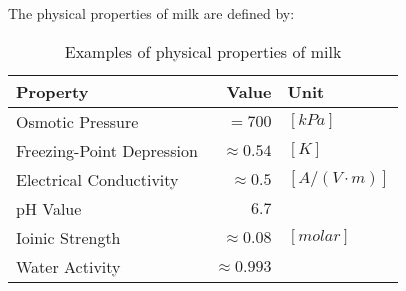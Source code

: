 The physical properties of milk are defined by:
\begin{table}[h]
    \centering
    \caption{Examples of physical properties of milk}
    \label{tab:milk_physical_properties}
    \begin{tabular}{ l  r l }
        \textbf{Property} & \textbf{Value} & \textbf{Unit}\\ 
        \hline
        Osmotic Pressure & $= 700$  & $[kPa]$ \\ 

        Freezing-Point Depression & $\approx 0.54$ & $[K]$ \\

        Electrical Conductivity & $\approx 0.5$ & $[A/(V \cdot m)]$ \\ 

        pH Value & $6.7$ & \\

        Ioinic Strength & $\approx 0.08$ & $[molar]$ \\

        Water Activity & $\approx 0.993$ & \\

    \end{tabular}
\end{table}






